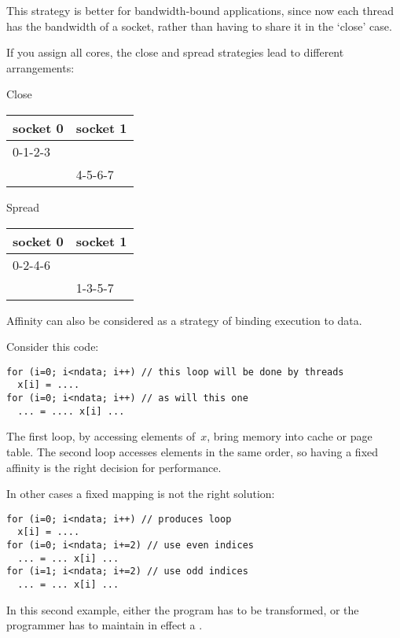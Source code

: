 This strategy is better for bandwidth-bound applications, since now
each thread has the bandwidth of a socket, rather than having to share
it in the `close' case.

If you assign all cores, the close and spread strategies lead to
different arrangements:\\

\begin{multicols}{2}
  Close
\begin{tabular}{ll}
  \toprule
  socket 0 & socket 1\\
  \midrule
  0-1-2-3 & \\
  & 4-5-6-7\\
  \bottomrule
\end{tabular}
\columnbreak
Spread
\begin{tabular}{ll}
  \toprule
  socket 0 & socket 1\\
  \midrule
  0-2-4-6 & \\
  & 1-3-5-7 \\
  \bottomrule
\end{tabular}
\end{multicols}


Affinity can also be considered as a strategy of binding execution to data.

Consider this code:
\begin{verbatim}
for (i=0; i<ndata; i++) // this loop will be done by threads
  x[i] = ....
for (i=0; i<ndata; i++) // as will this one
  ... = .... x[i] ...
\end{verbatim}
The first loop, by accessing elements of~$x$, bring memory into cache
or page table. The second loop accesses elements in the same order, so
having a fixed affinity is the right decision for performance.

In other cases a fixed mapping is not the right solution:
\begin{verbatim}
for (i=0; i<ndata; i++) // produces loop
  x[i] = ....
for (i=0; i<ndata; i+=2) // use even indices
  ... = ... x[i] ...
for (i=1; i<ndata; i+=2) // use odd indices
  ... = ... x[i] ...
\end{verbatim}
In this second example, either the program has to be transformed, or
the programmer has to maintain in effect a .



